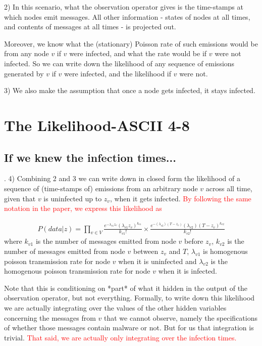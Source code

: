 \documentclass{article}
\begin{document}
	2) In this scenario, what the observation operator gives is the
	time-stamps at which nodes emit messages. All other information -
	states of nodes at all times, and contents of messages at all times -
	is projected out.

	Moreover, we know what the (stationary) Poisson rate of such emissions
	would be from any node $v$ if $v$ were infected, and what the rate would
	be if $v$ were not infected. So we can write down the likelihood of any
	sequence of emissions generated by $v$ if $v$ were infected, and the
	likelihood if $v$ were not.

	3) We also make the assumption that once a node gets infected, it
	stays infected.

\section{The Likelihood-ASCII 4-8}
\subsection{If we knew the infection times...}	
    .
	4) Combining 2 and 3  we can write down in closed form the likelihood
        of a sequence of (time-stamps of) emissions from an arbitrary node $v$ 
        across all time, given that  $v$ is uninfected up to $z_{v}$, when it 
        gets infected. \textcolor{red}{By following the same notation in the 
        paper, we express this likelihood as}
        
        \begin{align}
        P(data | z) = \prod_{v\in V}\frac{e^{-\lambda_{v1}z_v}(\lambda_{v1}z_v)^{k_{v1}}}{k_{v1}!}\times 
        \frac{e^{-(\lambda_{v2})(T-z_v)}(\lambda_{v2})(T-z_v)^{k_{v2}}}{k_{v2}!}
        \end{align}
        where $k_{v1}$ is the number of messages emitted from node $v$ before 
        $z_v$, $k_{v2}$ is the number of messages emitted from node $v$ between 
        $z_v$ and $T$, $\lambda_{v1}$ is  homogenous poisson transmission rate for
        node $v$ when it is uninfected and $\lambda_{v2}$ is the  homogenous 
        poisson transmission rate for node $v$ when it is infected.  
 
	Note that this is conditioning on *part* of what it hidden in the
	output of the observation operator, but not everything.  Formally, to
	write down this likelihood we are actually integrating over the values
	of the other hidden variables concerning the messages from $v$ that we
	cannot observe, namely the specifications of whether those messages
	contain malware or not. But for us that integration is trivial. 
	\textcolor{red}{That said, we are actually only integrating over the 
         infection times.}
\end{document}
